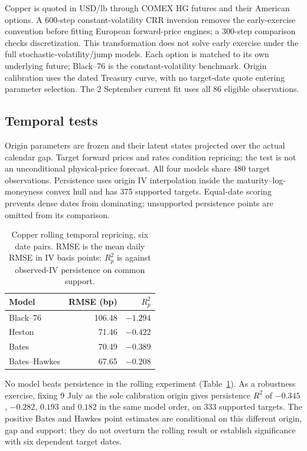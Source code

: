 Copper is quoted in USD/lb through COMEX HG futures and their American options. A 600-step constant-volatility CRR inversion removes the early-exercise convention before fitting European forward-price engines; a 300-step comparison checks discretization. This transformation does not solve early exercise under the full stochastic-volatility/jump models. Each option is matched to its own underlying future; Black--76 is the constant-volatility benchmark. Origin calibration uses the dated Treasury curve, with no target-date quote entering parameter selection. The 2 September current fit uses all 86 eligible observations.

\subsection{Temporal tests}
Origin parameters are frozen and their latent states projected over the actual calendar gap. Target forward prices and rates condition repricing; the test is not an unconditional physical-price forecast. All four models share 480 target observations. Persistence uses origin IV interpolation inside the maturity--log-moneyness convex hull and has 375 supported targets. Equal-date scoring prevents dense dates from dominating; unsupported persistence points are omitted from its comparison.

\begin{table}[H]
\centering
\caption{Copper rolling temporal repricing, six date pairs. RMSE is the mean daily RMSE in IV basis points; $R^2_p$ is against observed-IV persistence on common support.}
\begin{tabular}{@{}lrr@{}}
\toprule
Model & RMSE (bp) & $R^2_p$ \\
\midrule
Black--76 & 106.48 & $-1.294$ \\
Heston & 71.46 & $-0.422$ \\
Bates & 70.49 & $-0.389$ \\
Bates--Hawkes & 67.65 & $-0.208$ \\
\bottomrule
\end{tabular}
\label{tab:copper-oos}
\end{table}

No model beats persistence in the rolling experiment (Table~\ref{tab:copper-oos}). As a robustness exercise, fixing 9 July as the sole calibration origin gives persistence $R^2$ of $-0.345$, $-0.282$, $0.193$ and $0.182$ in the same model order, on 333 supported targets. The positive Bates and Hawkes point estimates are conditional on this different origin, gap and support; they do not overturn the rolling result or establish significance with six dependent target dates.

